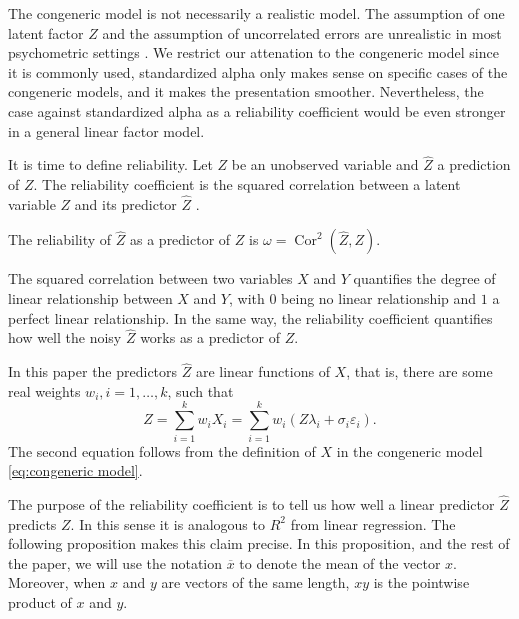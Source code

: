 \documentclass[twoside]{article}
\DeclareMathOperator{\Cor}{Cor}
\begin{document}
The congeneric model is not necessarily a realistic model. The assumption of one latent factor $Z$ and the assumption of uncorrelated errors are unrealistic in most psychometric settings \citep[][Section 1.2 -- 1.3]{Green2009-le}. We restrict our attenation to the congeneric model since it is commonly used, standardized alpha only makes sense on specific cases of the congeneric models, and it makes the presentation smoother. Nevertheless, the case against standardized alpha as a reliability coefficient would be even stronger in a general linear factor model. %

It is time to define reliability. Let $Z$ be an unobserved variable and $\hat{Z}$ a prediction of $Z$. The reliability coefficient is the squared correlation between a latent variable $Z$ and its predictor $\hat{Z}$ \citep[][p. 61]{Lord1968-ax}. 

\begin{defn}\label{defn:reliability} The reliability of $\hat{Z}$ as a predictor of $Z$ is $\omega=\Cor^{2}(\hat{Z},Z)$.
\end{defn} 

The squared correlation between two variables $X$ and $Y$ quantifies the degree of linear relationship between $X$ and $Y$, with $0$ being no linear relationship and $1$ a perfect linear relationship. In the same way, the reliability coefficient quantifies how well the noisy $\hat{Z}$ works as a predictor of $Z$.

In this paper the predictors $\hat{Z}$ are linear functions of $X$, that is, there are some real weights $w_{i},i=1,\ldots,k$, such that
\begin{equation}
\label{eq:Linear predictor}
\hat{Z} =  \sum_{i=1}^{k} w_{i}X_i = \sum_{i=1}^{k}w_{i}(Z\lambda_i + \sigma_{i} \varepsilon_i).\nonumber 
\end{equation}
The second equation follows from the definition of $X$ in the congeneric model \eqref{eq:congeneric model}. 


The purpose of the reliability coefficient is to tell us how well a linear predictor $\hat{Z}$ predicts $Z$. In this sense it is analogous to $R^2$ from linear regression. The following proposition makes this claim precise. In this proposition, and the rest of the paper, we will use the notation $\overline{x}$ to denote the mean of the vector $x$. Moreover, when $x$ and $y$ are vectors of the same length, $xy$ is the pointwise product of $x$ and $y$.
\end{document}
